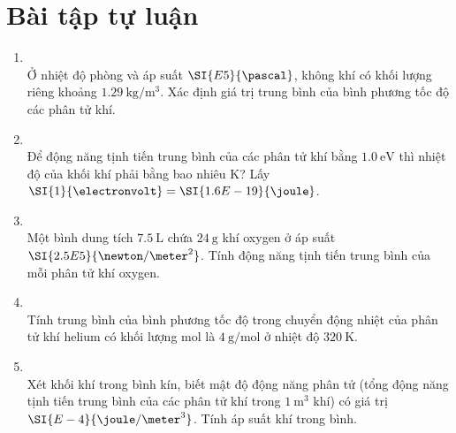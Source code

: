 \section{Bài tập tự luận}
\begin{enumerate}[label=\bfseries Câu \arabic*:, leftmargin=1.7cm]
	\item{}\\
	Ở nhiệt độ phòng và áp suất $\SI{E5}{\pascal}$, không khí có khối lượng riêng khoảng $\SI{1.29}{\kilogram/\meter^3}$. Xác định giá trị trung bình của bình phương tốc độ các phân tử khí.

\item {}\\
Để động năng tịnh tiến trung bình của các phân tử khí bằng $\SI{1.0}{\electronvolt}$ thì nhiệt độ của khối khí phải bằng bao nhiêu $\si{\kelvin}$? Lấy $\SI{1}{\electronvolt}=\SI{1.6E-19}{\joule}$.

\item {}\\
Một bình dung tích $\SI{7.5}{\liter}$ chứa $\SI{24}{\gram}$ khí oxygen ở áp suất $\SI{2.5E5}{\newton/\meter^2}$. Tính động năng tịnh tiến trung bình của mỗi phân tử khí oxygen.

\item {}\\
Tính trung bình của bình phương tốc độ trong chuyển động nhiệt của phân tử khí helium có khối lượng mol là $\SI{4}{\gram/\mole}$ ở nhiệt độ $\SI{320}{\kelvin}$.

\item {}\\
Xét khối khí trong bình kín, biết mật độ động năng phân tử (tổng động năng tịnh tiến trung bình của các phân tử khí trong $\SI{1}{\meter^3}$ khí) có giá trị $\SI{E-4}{\joule/\meter^3}$. Tính áp suất khí trong bình.


\end{enumerate}
